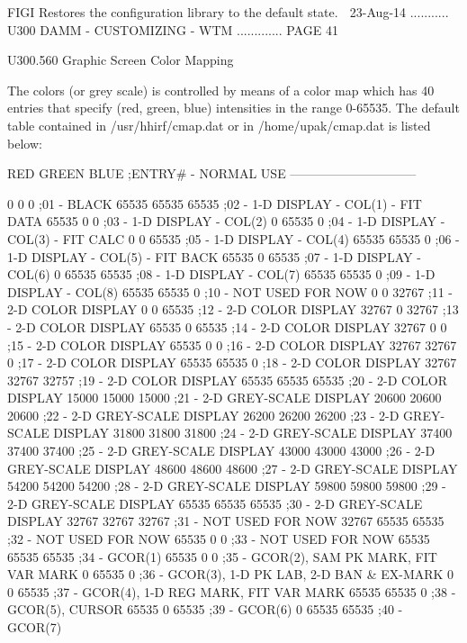    FIGI   Restores the configuration library to the default state.
    
   23-Aug-14 ........... U300  DAMM - CUSTOMIZING - WTM ............. PAGE  41
 
   U300.560  Graphic Screen Color Mapping
 
   The  colors (or grey scale) is controlled by means of a color map which has
   40 entries that  specify  (red,  green,  blue)  intensities  in  the  range
   0-65535.  The  default  table  contained  in  /usr/hhirf/cmap.dat   or   in
   /home/upak/cmap.dat is listed below:
 
       RED  GREEN   BLUE   ;ENTRY# - NORMAL USE ------------------------------
 
         0      0      0  ;01 - BLACK
     65535  65535  65535  ;02 - 1-D DISPLAY - COL(1) - FIT DATA
     65535      0      0  ;03 - 1-D DISPLAY - COL(2)
         0  65535      0  ;04 - 1-D DISPLAY - COL(3) - FIT CALC
         0      0  65535  ;05 - 1-D DISPLAY - COL(4)
     65535  65535      0  ;06 - 1-D DISPLAY - COL(5) - FIT BACK
     65535      0  65535  ;07 - 1-D DISPLAY - COL(6)
         0  65535  65535  ;08 - 1-D DISPLAY - COL(7)
     65535  65535      0  ;09 - 1-D DISPLAY - COL(8)
     65535  65535      0  ;10 - NOT USED FOR NOW
         0      0  32767  ;11 - 2-D COLOR DISPLAY
         0      0  65535  ;12 - 2-D COLOR DISPLAY
     32767      0  32767  ;13 - 2-D COLOR DISPLAY
     65535      0  65535  ;14 - 2-D COLOR DISPLAY
     32767      0      0  ;15 - 2-D COLOR DISPLAY
     65535      0      0  ;16 - 2-D COLOR DISPLAY
     32767  32767      0  ;17 - 2-D COLOR DISPLAY
     65535  65535      0  ;18 - 2-D COLOR DISPLAY
     32767  32767  32757  ;19 - 2-D COLOR DISPLAY
     65535  65535  65535  ;20 - 2-D COLOR DISPLAY
     15000  15000  15000  ;21 - 2-D GREY-SCALE DISPLAY
     20600  20600  20600  ;22 - 2-D GREY-SCALE DISPLAY
     26200  26200  26200  ;23 - 2-D GREY-SCALE DISPLAY
     31800  31800  31800  ;24 - 2-D GREY-SCALE DISPLAY
     37400  37400  37400  ;25 - 2-D GREY-SCALE DISPLAY
     43000  43000  43000  ;26 - 2-D GREY-SCALE DISPLAY
     48600  48600  48600  ;27 - 2-D GREY-SCALE DISPLAY
     54200  54200  54200  ;28 - 2-D GREY-SCALE DISPLAY
     59800  59800  59800  ;29 - 2-D GREY-SCALE DISPLAY
     65535  65535  65535  ;30 - 2-D GREY-SCALE DISPLAY
     32767  32767  32767  ;31 - NOT USED FOR NOW
     32767  65535  65535  ;32 - NOT USED FOR NOW
     65535      0      0  ;33 - NOT USED FOR NOW
     65535  65535  65535  ;34 - GCOR(1)
     65535      0      0  ;35 - GCOR(2), SAM PK MARK,  FIT VAR MARK
         0  65535      0  ;36 - GCOR(3), 1-D PK LAB, 2-D BAN & EX-MARK
         0      0  65535  ;37 - GCOR(4), 1-D REG MARK, FIT VAR MARK
     65535  65535      0  ;38 - GCOR(5), CURSOR
     65535      0  65535  ;39 - GCOR(6)
         0  65535  65535  ;40 - GCOR(7)
 
